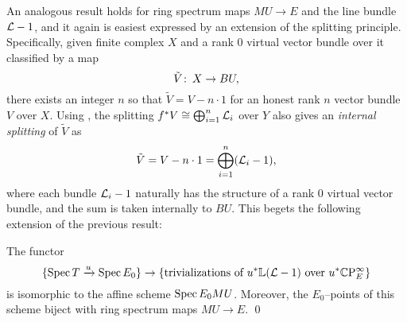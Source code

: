 An analogous result holds for ring spectrum maps $MU \to E$ and the line bundle $\mathcal{L} - 1$, and it again is easiest expressed by an extension of the splitting principle.  Specifically, given finite complex $X$ and a rank $0$ virtual vector bundle over it classified by a map \[\tilde V \colon\thinspace X \to BU,\] there exists an integer $n$ so that $\tilde V = V - n \cdot 1$ for an honest rank $n$ vector bundle $V$ over $X$.  Using , the splitting $f^* V \cong \bigoplus_{i=1}^n \mathcal{L}_i$ over $Y$ also gives an \emph{internal splitting} of $\tilde V$ as \[\tilde V = V - n \cdot 1 = \bigoplus_{i=1}^n (\mathcal{L}_i - 1),\] where each bundle $\mathcal{L}_i - 1$ naturally has the structure of a rank $0$ virtual vector bundle, and the sum is taken internally to $BU$.  This begets the following extension of the previous result:
\begin{theorem}\label{BUTriumvirate}
The functor \[\{\operatorname{Spec} T \xrightarrow{u} \operatorname{Spec} E_0\} \to \left\{ \text{trivializations of $u^* \mathbb{L}(\mathcal{L} - 1)$ over $u^* \mathbb{C}\mathrm P^\infty_E$} \right\}\] is isomorphic to the affine scheme $\operatorname{Spec} E_0 MU$.  Moreover, the $E_0$--points of this scheme biject with ring spectrum maps $MU \to E$. \qed
{}
\end{theorem}



